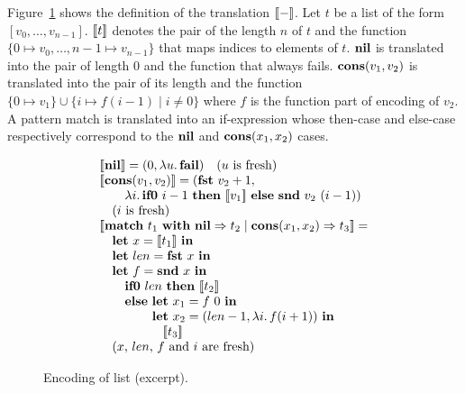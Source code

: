 
Figure~\ref{fig:list-translation} shows the definition of the
translation $[\![{-}]\!]$.  Let $t$ be a list of the form
$[v_0,\dots,v_{n-1}]$. $[\![{t}]\!]$ denotes the pair of the length $n$ of
$t$ and the function $\{0 \mapsto v_0, \dots, n-1 \mapsto v_{n-1}\}$
that maps indices to elements of $t$.  $\mathbf{nil}$ is translated into the pair of length $0$ and the
function that always fails.  $\mathbf{cons}({v_1},{v_2})$ is translated into the
pair of its length and the function $\{0 \mapsto v_1\} \cup \{i \mapsto
f (i-1) \mid i \neq 0\}$ where $f$ is the function part of encoding of
$v_2$.  A pattern match is translated into an if-expression whose
then-case and else-case respectively correspond to the $\mathbf{nil}$ and
$\mathbf{cons}({x_1},{x_2})$ cases.

\begin{figure}[t]
\begin{minipage}{\widthcoef\textwidth}
\[
\begin{array}{l}
 \Trans{\NIL} = \Pair{0}{\Abs{u}{\FAIL}} \quad (\text{$u$ is fresh}) \\

 \Trans{\Cons{v_1}{v_2}} = (\Fst{v_2} + 1, \\
 \qquad \Abs{i}{\If{i-1}{\Trans{v_1}}{\Snd{v_2}\ (i-1)}}) \\
 \quad (\text{$i$ is fresh}) \\

 \Trans{\Match{t_1}{t_2}{t_3}} = \\
 \quad \Let{x}{\Trans{t_1}}{} \\
 \quad \Let{len}{\Fst{x}}{} \\
 \quad \Let{f}{\Snd{x}}{} \\
 \qquad \IF\ len\ \THEN\ \Trans{t_2} \\
 \qquad \ELSE\ \Let{x_1}{f\ 0}{}\\
 \qquad\qquad\, \Let{x_2}{\Pair{len - 1}{\Abs{i}{f (i+1)}}}{} \\
 \qquad\qquad\quad \Trans{t_3} \\
 \quad (\text{$x$, $len$, $f$ and $i$ are fresh}) \\
\end{array}
\]
\end{minipage}
\caption{Encoding of list (excerpt).}
\label{fig:list-translation}
\end{figure}

